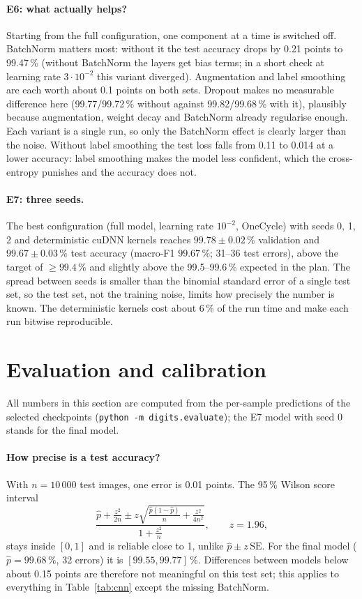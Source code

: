 \documentclass[11pt,a4paper]{article}
\newcommand{\1}{\mathbf{1}}
\begin{document}
\paragraph{E6: what actually helps?} Starting from the full configuration, one component at a
time is switched off. BatchNorm matters most: without it the test accuracy drops by 0.21 points
to 99.47\,\% (without BatchNorm the layers get bias terms; in a short check at learning rate
$3 \cdot 10^{-2}$ this variant diverged). Augmentation and label smoothing are
each worth about 0.1 points on both sets. Dropout makes no measurable difference here
(99.77/99.72\,\% without against 99.82/99.68\,\% with it), plausibly because augmentation,
weight decay and BatchNorm already regularise enough. Each variant is a single run, so only the
BatchNorm effect is clearly larger than the noise. Without label smoothing the test loss falls
from 0.11 to 0.014 at a lower accuracy: label smoothing makes the model less confident, which
the cross-entropy punishes and the accuracy does not.

\paragraph{E7: three seeds.} The best configuration (full model, learning rate $10^{-2}$,
OneCycle) with seeds 0, 1, 2 and deterministic cuDNN kernels reaches $99.78 \pm 0.02\,\%$
validation and $\mathbf{99.67 \pm 0.03\,\%}$ test accuracy (macro-F1 $99.67\,\%$; 31--36 test
errors), above the target of $\ge 99.4\,\%$ and slightly above the 99.5--99.6\,\% expected in
the plan. The spread between seeds is smaller than the binomial standard error of a single test
set, so the test set, not the training noise, limits how precisely the number is known. The
deterministic kernels cost about 6\,\% of the run time and make each run bitwise
reproducible.

\section{Evaluation and calibration}
\label{sec:calibration}

All numbers in this section are computed from the per-sample predictions of the selected
checkpoints (\texttt{python -m digits.evaluate}); the E7 model with seed 0 stands for the final
model.

\paragraph{How precise is a test accuracy?} With $n = 10\,000$ test images, one error is
0.01 points. The 95\,\% Wilson score interval
\[
  \frac{\hat p + \frac{z^2}{2n} \pm z \sqrt{\frac{\hat p (1 - \hat p)}{n} + \frac{z^2}{4n^2}}}
       {1 + \frac{z^2}{n}}, \qquad z = 1.96,
\]
stays inside $[0, 1]$ and is reliable close to 1, unlike $\hat p \pm z\,\mathrm{SE}$. For the
final model ($\hat p = 99.68\,\%$, 32 errors) it is $[99.55, 99.77]\,\%$. Differences between
models below about 0.15 points are therefore not meaningful on this test set; this applies to
everything in Table~\ref{tab:cnn} except the missing BatchNorm.
\end{document}
